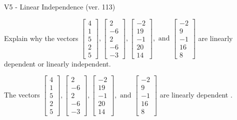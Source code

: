 \begin{exercise}
  \begin{exerciseTitle}V5 - Linear Independence (ver. 113)\end{exerciseTitle}
  \begin{exerciseStatement}
    Explain why the vectors \(\left[\begin{array}{r}
4 \\
1 \\
5 \\
2 \\
5
\end{array}\right] , \left[\begin{array}{r}
2 \\
-6 \\
2 \\
-6 \\
-3
\end{array}\right] , \left[\begin{array}{r}
-2 \\
19 \\
-1 \\
20 \\
14
\end{array}\right] , \text{ and } \left[\begin{array}{r}
-2 \\
9 \\
-1 \\
16 \\
8
\end{array}\right]\) are linearly dependent or linearly independent.	


  \end{exerciseStatement}
  \begin{exerciseAnswer}
   The vectors \(\left[\begin{array}{r}
4 \\
1 \\
5 \\
2 \\
5
\end{array}\right] , \left[\begin{array}{r}
2 \\
-6 \\
2 \\
-6 \\
-3
\end{array}\right] , \left[\begin{array}{r}
-2 \\
19 \\
-1 \\
20 \\
14
\end{array}\right] , \text{ and } \left[\begin{array}{r}
-2 \\
9 \\
-1 \\
16 \\
8
\end{array}\right]\) are 
  	 linearly dependent  .
  


  \end{exerciseAnswer}
\end{exercise}